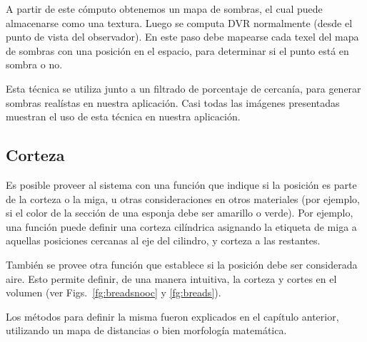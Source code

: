 A partir de este cómputo obtenemos un mapa de sombras, el cual puede almacenarse como una textura.
Luego se computa DVR normalmente (desde el punto de vista del observador).
En este paso debe mapearse cada texel del mapa de sombras con una posición en el espacio, para determinar si el punto está en sombra o no.

Esta técnica se utiliza junto a un filtrado de porcentaje de cercanía, para generar sombras realístas en nuestra aplicación.
Casi todas las imágenes presentadas muestran el uso de esta técnica en nuestra aplicación.


\subsection{Corteza}
Es posible proveer al sistema con una función que indique si la posición es parte de la corteza o la miga, u otras consideraciones en otros materiales (por ejemplo, si el color de la sección de una esponja debe ser amarillo o verde).
Por ejemplo, una función puede definir una corteza cilíndrica asignando la etiqueta de miga a aquellas posiciones cercanas al eje del cilindro, y corteza a las restantes.

También se provee otra función que establece si la posición debe ser considerada aire.
Esto permite definir, de una manera intuitiva, la corteza y cortes en el volumen (ver Figs.~\ref{fg:breadsnooc} y \ref{fg:breads}).

Los métodos para definir la misma fueron explicados en el capítulo anterior, utilizando un mapa de distancias o bien morfología matemática.





